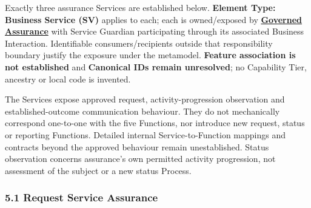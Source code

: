 Exactly three assurance Services are established below. \textbf{Element Type: Business Service (SV)} applies to each; each is owned/\allowbreak{}exposed by \textbf{\hyperref[rad:enabling:694]{Governed Assurance}} with Service Guardian participating through its associated Business Interaction. Identifiable consumers/\allowbreak{}recipients outside that responsibility boundary justify the exposure under the metamodel. \textbf{Feature association is not established} and \textbf{Canonical IDs remain unresolved}; no Capability Tier, ancestry or local code is invented.

\label{rad:assurance:160}

The Services expose approved request, activity-progression observation and established-outcome communication behaviour. They do not mechanically correspond one-to-one with the five Functions, nor introduce new request, status or reporting Functions. Detailed internal Service-to-Function mappings and contracts beyond the approved behaviour remain unestablished. Status observation concerns assurance's own permitted activity progression, not assessment of the subject or a new status Process.

\label{rad:assurance:162}



\label{rad:assurance:164}
\subsubsection*{5.1 Request Service Assurance}
\label{rad:assurance:166}

